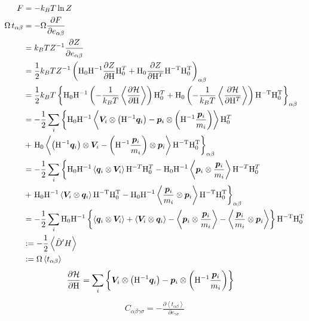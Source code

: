 \documentclass[11pt,a4paper,uplatex]{jsarticle}
\begin{document}
\begin{align}
    F &= - k_{B} T  \ln Z \\
    \Omega \, t_{\alpha \beta} &= - \Omega \frac{\partial F}{\partial e_{\alpha \beta}} \\
    &= k_{B} T Z^{-1} \frac{\partial Z}{\partial e_{\alpha \beta}} \\
    &= \frac{1}{2} k_{B} T Z^{-1} \left({\rm H_{0}H^{-1}}\frac{\partial Z}{\partial {\rm H}}{\rm H}_{0}^{T} + {\rm H_{0}}\frac{\partial Z}{\partial {\rm H}^T}{\rm H^{-T}}{\rm H_{0}^{T}}\right)_{\alpha \beta} \\ 
    &= \frac{1}{2} k_{B} T \left\{ {\rm H_{0}H^{-1}}\left(-\frac{1}{k_{B}T} \left< \frac{\partial {\cal H}}{\partial {\rm H}}\right> \right){\rm H}_{0}^{T}  
    + {\rm H_{0}} \left(-\frac{1}{k_{B}T} \left< \frac{\partial {\cal H}}{\partial {\rm H}^{T}}\right> \right){\rm H^{-T}}{\rm H_{0}^{T}}\right\}_{\alpha \beta} \\  
    &= -\frac{1}{2} \sum_{i} \left\{ {\rm H_{0}H^{-1}}\left< \bm{V}_{i}  \otimes \left({\rm H}^{-1} \bm{q}_{i}\right) - \bm{p}_{i} \otimes \left( {\rm H}^{-1}\frac{\bm{p}_{i}}{m_{i}}  \right)  \right> {\rm H}_{0}^{T} \right.\\
    &+ \left. {\rm H_{0}} \left< \left({\rm H}^{-1} \bm{q}_{i}\right) \otimes \bm{V}_{i}
    -  \left( {\rm H}^{-1}\frac{\bm{p}_{i}}{m_{i}}  \right) \otimes \bm{p}_{i} \right> {\rm H^{-T}}{\rm H_{0}^{T}}\right\}_{\alpha \beta} \\ 
    &= -\frac{1}{2} \sum_{i} \left\{ {\rm H_{0}H^{-1}}\left< \bm{q}_{i} \otimes \bm{V}_{i} \right> {\rm H}^{-T} {\rm H}_{0}^{T} - {\rm H_{0} H^{-1}} \left<\bm{p}_{i} \otimes \frac{\bm{p}_{i}}{m_{i}}   \right> {\rm H}^{-T} {\rm H}_{0}^{T} \right.\\
    &+ \left. {\rm H_{0}}{\rm H}^{-1}  \left< \bm{V}_{i} \otimes  \bm{q}_{i} \right> {\rm H^{-T} H_{0}^{T}} 
    -   {\rm H_{0} H}^{-1} \left< \frac{\bm{p}_{i}}{m_{i}} \otimes \bm{p}_{i} \right> {\rm H^{-T}}{\rm H_{0}^{T}}\right\}_{\alpha \beta} \\
    &= -\frac{1}{2} \sum_{i} {\rm H_{0}H^{-1}} \left\{ \left< \bm{q}_{i} \otimes \bm{V}_{i} \right>  + \left< \bm{V}_{i} \otimes  \bm{q}_{i} \right> - \left<\bm{p}_{i} \otimes \frac{\bm{p}_{i}}{m_{i}}   \right>  
    -  \left< \frac{\bm{p}_{i}}{m_{i}} \otimes \bm{p}_{i} \right> \right\} {\rm H^{-T}}{\rm H_{0}^{T}} \\
    &:= -\frac{1}{2} \left< \hat{D}' H \right> \\
    &:= \Omega \left< t_{\alpha \beta} \right>
\end{align}
\begin{align}
\frac{\partial {\cal H}}{\partial {\rm H}} &= \sum_{i} \left\{ \bm{V}_{i} \otimes \left({\rm H}^{-1} \bm{q}_{i}\right)
- \bm{p}_{i} \otimes \left( {\rm H}^{-1}\frac{\bm{p}_{i}}{m_{i}}  \right) \right\}     
\end{align}
\begin{align}
    C_{\alpha \beta \gamma \sigma} = -\frac{\partial \left< t_{\alpha \beta} \right>}{\partial e_{\gamma \sigma}}
\end{align}

%
\end{document}

